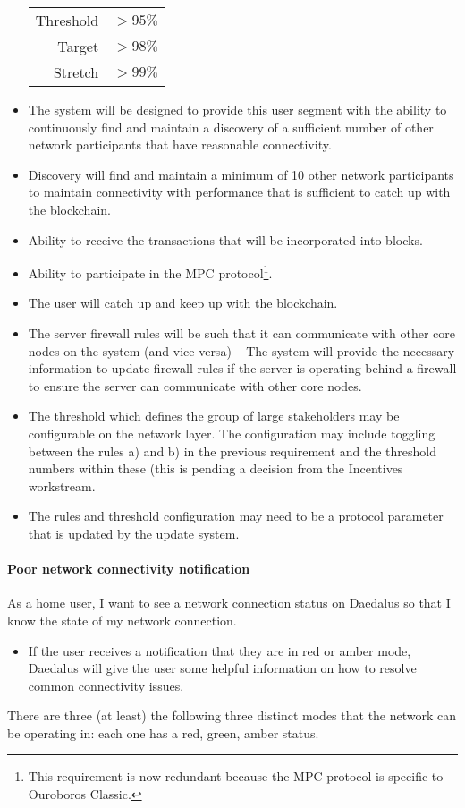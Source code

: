 \documentclass{report}
\theoremstyle{definition}{
  \newtheorem{lemma}{Lemma}[section] %
  \newtheorem{definition}[lemma]{Definition}
}
\theoremstyle{theorem}{
  \newtheorem{invariant}[lemma]{Invariant}
  \newtheorem{proofobligation}[lemma]{Proof Obligation}
}
\numberwithin{equation}{lemma}
\begin{document}
\begin{itemize}
      \begin{tabular}{rl}
      Threshold & $>95\%$ \\
      Target    & $>98\%$ \\
      Stretch   & $>99\%$
      \end{tabular}
\item The system will be designed to provide this user segment with the ability
      to continuously find and maintain a discovery of a sufficient number of
      other network participants that have reasonable connectivity.
\item Discovery will find and maintain a minimum of 10 other network
      participants to maintain connectivity with performance that is sufficient
      to catch up with the blockchain.
\item Ability to receive the transactions that will be incorporated into blocks.
\item Ability to participate in the MPC protocol\footnote{This requirement is
      now redundant because the MPC protocol is specific to Ouroboros Classic.}.
\item The user will catch up and keep up with the blockchain.
\item The server firewall rules will be such that it can communicate with other
      core nodes on the system (and vice versa) -- The system will provide the
      necessary information to update firewall rules if the server is operating
      behind a firewall to ensure the server can communicate with other core
      nodes.
\item The threshold which defines the group of large stakeholders may be
      configurable on the network layer. The configuration may include toggling
      between the rules a) and b) in the previous requirement and the threshold
      numbers within these (this is pending a decision from the Incentives
      workstream.
\item The rules and threshold configuration may need to be a protocol parameter
      that is updated by the update system.
\end{itemize}


\paragraph{Poor network connectivity notification}

As a home user, I want to see a network connection status on Daedalus so that
I know the state of my network connection.
%
\begin{itemize}
\item If the user receives a notification that they are in red or amber mode,
      Daedalus will give the user some helpful information on how to resolve
      common connectivity issues.
\end{itemize}
%
There are three (at least) the following three distinct modes that the network can be operating in:
each one has a red, green, amber status.
\end{document}
